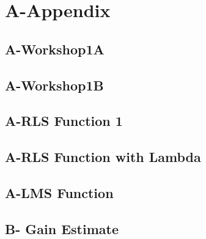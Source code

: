 \documentclass{article}
\begin{document}
\section*{A-Appendix}
\subsection*{A-Workshop1A}

\subsection*{A-Workshop1B}

\subsection*{A-RLS Function 1}

\subsection*{A-RLS Function with Lambda}

\subsection*{A-LMS Function}

\subsection*{B- Gain Estimate}

\end{document}

